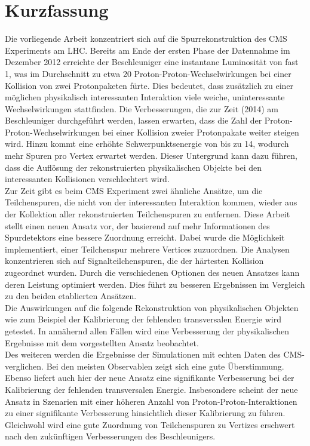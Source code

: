 \chapter*{Kurzfassung}


Die vorliegende Arbeit konzentriert sich auf die Spurrekonstruktion des CMS Experiments am LHC. Bereits am Ende der ersten Phase der Datennahme im Dezember 2012 erreichte der Beschleuniger eine instantane Luminosit\"a{}t von fast 1\percms{}, was im Durchschnitt zu etwa 20 Proton-Proton-Wechselwirkungen bei einer Kollision von zwei Protonpaketen f\"u{}rte. Dies bedeutet, dass zus\"a{}tzlich zu einer m\"o{}glichen physikalisch interessanten Interaktion viele weiche, uninteressante Wechselwirkungen stattfinden. Die Verbesserungen, die zur Zeit (2014) am Beschleuniger durchgef\"u{}hrt werden, lassen erwarten, dass die Zahl der Proton-Proton-Wechselwirkungen bei einer Kollision zweier Protonpakate weiter steigen wird. Hinzu kommt eine erh\"o{}hte Schwerpunktsenergie von bis zu 14\TeV{}, wodurch mehr Spuren pro Vertex erwartet werden. Dieser Untergrund kann dazu f\"u{}hren, dass die Aufl\"o{}sung der rekonstruierten physikalischen Objekte bei den interessanten Kollisionen verschlechtert wird. \\
Zur Zeit gibt es beim CMS Experiment zwei \"a{}hnliche Ans\"a{}tze, um die Teilchenspuren, die nicht von der interessanten Interaktion kommen, wieder aus der Kollektion aller rekonstruierten Teilchenspuren zu entfernen. Diese Arbeit stellt einen neuen Ansatz vor, der basierend auf mehr Informationen des Spurdetektors eine bessere Zuordnung erreicht. Dabei wurde die M\"o{}glichkeit implementiert, einer Teilchenspur mehrere Vertices zuzuordnen. Die Analysen konzentrieren sich auf Signalteilchenspuren, die der h\"a{}rtesten Kollision zugeordnet wurden. Durch die verschiedenen Optionen des neuen Ansatzes kann deren Leistung optimiert werden. Dies f\"u{}hrt zu besseren Ergebnissen im Vergleich zu den beiden etablierten Ans\"a{}tzen. \\
Die Auswirkungen auf die folgende Rekonstruktion von physikalischen Objekten wie zum Beispiel der Kalibrierung der fehlenden transversalen Energie wird getestet. In ann\"a{}hernd allen F\"a{}llen wird eine Verbesserung der physikalischen Ergebnisse mit dem vorgestellten Ansatz beobachtet. \\
Des weiteren werden die Ergebnisse der Simulationen mit echten Daten des CMS- verglichen. Bei den meisten Observablen zeigt sich eine gute \"U{}berstimmung. Ebenso liefert auch hier der neue Ansatz eine signifikante Verbesserung bei der Kalibrierung der fehlenden transversalen Energie. Insbesondere scheint der neue Ansatz in Szenarien mit einer h\"o{}heren Anzahl von Proton-Proton-Interaktionen zu einer signifikante Verbesserung hinsichtlich dieser Kalibrierung zu f\"u{}hren. Gleichwohl wird eine gute Zuordnung von Teilchenspuren zu Vertizes erschwert nach den zuk\"u{}nftigen Verbesserungen des Beschleunigers.

